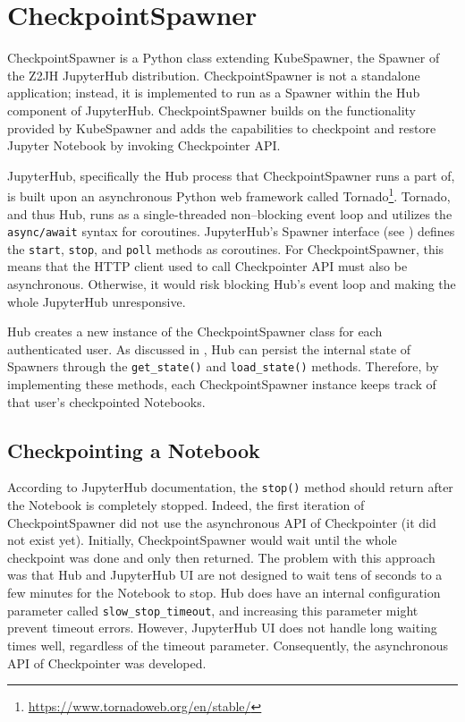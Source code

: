 \documentclass[
  digital,     %
  oneside,     %
  nosansbold,  %
  nocolorbold, %
  lof,         %
  nolot,         %
]{fithesis4}
\begin{document}
\chapter{CheckpointSpawner}
\label{chap:checkpoint_spawner}

CheckpointSpawner is a Python class extending KubeSpawner, the Spawner of the Z2JH JupyterHub distribution. CheckpointSpawner is not a standalone application; instead, it is implemented to run as a Spawner within the Hub component of JupyterHub. CheckpointSpawner builds on the functionality provided by KubeSpawner and adds the capabilities to checkpoint and restore Jupyter Notebook by invoking Checkpointer API. 

JupyterHub, specifically the Hub process that CheckpointSpawner runs a part of, is built upon an asynchronous Python web framework called Tornado\footnote{\url{https://www.tornadoweb.org/en/stable/}}. Tornado, and thus Hub, runs as a single-threaded non--blocking event loop and utilizes the \texttt{async/await} syntax for coroutines. JupyterHub's Spawner interface (see ) defines the \texttt{start}, \texttt{stop}, and \texttt{poll} methods as coroutines. For CheckpointSpawner, this means that the HTTP client used to call Checkpointer API must also be asynchronous. Otherwise, it would risk blocking Hub's event loop and making the whole JupyterHub unresponsive.

Hub creates a new instance of the CheckpointSpawner class for each authenticated user. As discussed in , Hub can persist the internal state of Spawners through the \texttt{get\_state()} and \texttt{load\_state()} methods. Therefore, by implementing these methods, each CheckpointSpawner instance keeps track of that user's checkpointed Notebooks.


\section{Checkpointing a Notebook}
According to JupyterHub documentation, the \texttt{stop()} method should return after the Notebook is completely stopped. Indeed, the first iteration of CheckpointSpawner did not use the asynchronous API of Checkpointer (it did not exist yet). Initially, CheckpointSpawner would wait until the whole checkpoint was done and only then returned. The problem with this approach was that Hub and JupyterHub UI are not designed to wait tens of seconds to a few minutes for the Notebook to stop. Hub does have an internal configuration parameter called \texttt{slow\_stop\_timeout}, and increasing this parameter might prevent timeout errors. However, JupyterHub UI does not handle long waiting times well, regardless of the timeout parameter. Consequently, the asynchronous API of Checkpointer was developed.
\end{document}
